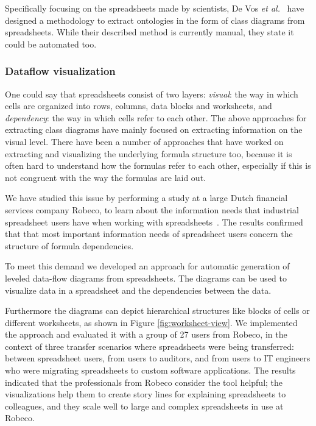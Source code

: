 \documentclass[conference]{IEEEtran}
\begin{document}
Specifically focusing on the spreadsheets made by scientists, De Vos \emph{et al.}~\cite{vos_g.:_2012} have designed a methodology to extract ontologies in the form of class diagrams from spreadsheets. While their described method is currently manual, they state it could be automated too. 


\subsubsection{Dataflow visualization}
One could say that spreadsheets consist of two layers: \emph{visual}: the way in which cells are organized into rows, columns, data blocks and worksheets, and \emph{dependency}: the way in which cells refer to each other. The above approaches for extracting class diagrams have mainly focused on extracting information on the visual level. There have been a number of approaches that have worked on extracting and visualizing the underlying formula structure too, because it is often hard to understand how the formulas refer to each other, especially if this is not congruent with the way the formulas are laid out. 

We have studied this issue by performing a study at a large Dutch financial services company Robeco, to learn about the information needs that industrial spreadsheet users have when working with spreadsheets~\cite{hermans_supporting_2011}. The results confirmed that that most important information needs of spreadsheet users concern the structure of formula dependencies.

To meet this demand we developed an approach for automatic generation of leveled data-flow diagrams from spreadsheets. The diagrams can be used to visualize data in a spreadsheet and the dependencies between the data. 

Furthermore the diagrams can depict hierarchical structures like blocks of cells or different worksheets, as shown in Figure \ref{fig:worksheet-view}. We implemented the approach and evaluated it with a group of 27 users from Robeco, in the context of three transfer scenarios where spreadsheets were being transferred: between spreadsheet users, from users to auditors, and from users to IT engineers who were migrating spreadsheets to custom software applications. The results indicated that the professionals from Robeco consider the tool helpful; the visualizations help them to create story lines for explaining spreadsheets to colleagues, and they scale well to large and complex spreadsheets in use at Robeco. 
\end{document}
